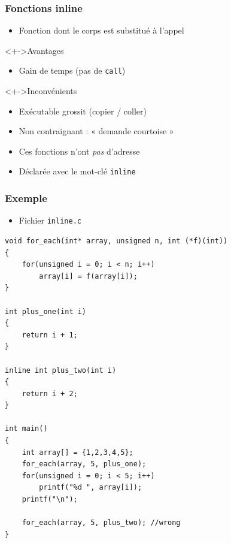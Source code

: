 \begin{frame}
\frametitle{Fonctions inline}
\begin{itemize}[<+->]
\item Fonction dont le corps est substitué à l'appel
\end{itemize}
\begin{exampleblock}<+->{Avantages}
	\begin{itemize}[<+->]
	\item Gain de temps (pas de \texttt{call})
	\end{itemize}
\end{exampleblock}
\begin{alertblock}<+->{Inconvénients}
	\begin{itemize}[<+->]
	\item Exécutable grossit (copier / coller)
	\end{itemize}
\end{alertblock}
\begin{itemize}[<+->]
\item Non contraignant : « demande courtoise »
\item Ces fonctions n'ont \emph{pas} d'adresse
\item Déclarée avec le mot-clé \lstinline|inline|
\end{itemize}
\end{frame}

\begin{frame}[containsverbatim]
\frametitle{Exemple}
\begin{itemize}
\item Fichier \texttt{inline.c}
\end{itemize}
\begin{lstlisting}
void for_each(int* array, unsigned n, int (*f)(int))
{
    for(unsigned i = 0; i < n; i++)
        array[i] = f(array[i]);
}

int plus_one(int i)
{
    return i + 1;   
}

inline int plus_two(int i)
{
    return i + 2;   
}

int main()
{
    int array[] = {1,2,3,4,5};
    for_each(array, 5, plus_one);
    for(unsigned i = 0; i < 5; i++)
        printf("%d ", array[i]);
    printf("\n");
     
    for_each(array, 5, plus_two); //wrong
}
\end{lstlisting}
\end{frame}


